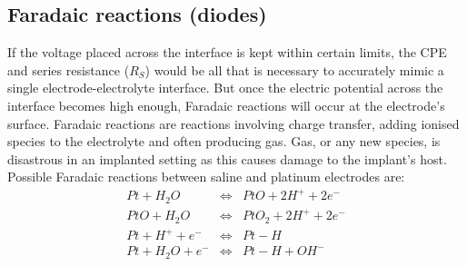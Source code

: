 

  \subsection{Faradaic reactions (diodes)}


    If the voltage placed across the interface is kept within certain limits, the CPE and series resistance ($R_{S}$) would be all that is necessary to accurately mimic a single electrode-electrolyte interface.
    But once the electric potential across the interface becomes high enough, Faradaic reactions will occur at the electrode's surface.
    Faradaic reactions are reactions involving charge transfer, adding ionised species to the electrolyte and often producing gas.
    Gas, or any new species, is disastrous in an implanted setting as this causes damage to the implant's host.
    Possible Faradaic reactions between saline and platinum electrodes are:
    \begin{eqnarray}
        Pt + H_{2}O &\Leftrightarrow& PtO + 2 H^{+} + 2 e^{-}\\
        PtO + H_{2}O &\Leftrightarrow& PtO_{2} + 2 H^{+} + 2e^{-}\\
        Pt + H^{+} + e^{-} & \Leftrightarrow & Pt-H\\
        Pt + H_{2}O + e^{-} &\Leftrightarrow& Pt-H+OH^{-}
    \end{eqnarray}

